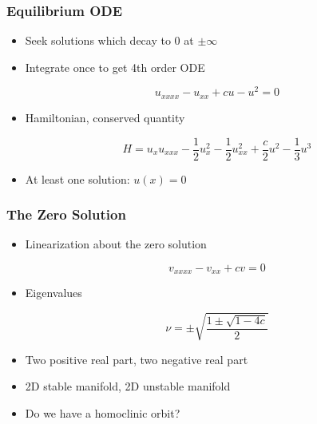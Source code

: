 \documentclass[16pt]{beamer}
\begin{document}
\begin{frame}
	\frametitle{Equilibrium ODE}
	\fontsize{16}{7.2}\selectfont
	\begin{itemize}
		\item<1->Seek solutions which decay to 0 at $\pm \infty$
		\vspace{0.5cm}
		\item<2->Integrate once to get 4th order ODE 
		\begin{center}
		\[u_{xxxx} - u_{xx} + cu - u^2 = 0\]
		\end{center}
		\vspace{0.5cm}
		\item<3->Hamiltonian, conserved quantity
		\begin{center}
		\[
		H = u_x u_{xxx} - \frac{1}{2}u_x^2 - \frac{1}{2}u_{xx}^2 + \frac{c}{2}u^2 - \frac{1}{3}u^3
		\]
		\end{center}
		\item<4->At least one solution: $u(x) = 0$
	\end{itemize} 
\end{frame}

\begin{frame}
	\frametitle{The Zero Solution}
	\fontsize{16}{7.2}\selectfont
	\begin{itemize}
		\item<1->Linearization about the zero solution
		\begin{center}
		\[v_{xxxx} - v_{xx} + c v = 0 \]
		\end{center}
		\item<2->Eigenvalues
		\begin{center}
		\[ \nu = \pm \sqrt{ \frac{1 \pm \sqrt{1 - 4c } }{ 2} } \]
		\end{center}
		\item<3->Two positive real part, two negative real part
		\item<4->2D stable manifold, 2D unstable manifold
		\item<5->Do we have a homoclinic orbit?
	\end{itemize}
\end{frame}
\end{document}
